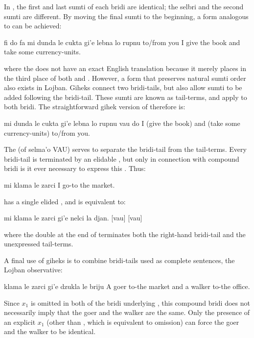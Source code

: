 In , the first and last sumti of
    each bridi are identical; the selbri and the second sumti are
    different. By moving the final sumti to the beginning, a form
    analogous to  can be achieved:
\begin{example}
fi do fa mi dunda le cukta\n
\T	gi'e lebna lo rupnu\n
to/from you I give the book\n
\T	and take some currency-units.
\end{example}

{\noindent}where the  does not have an exact English translation
    because it merely places  in the third place of both
     and . However, a form that preserves natural
    sumti order also exists in Lojban. Giheks connect two
    bridi-tails, but also allow sumti to be added following the
    bridi-tail. These sumti are known as tail-terms, and apply to
    both bridi. The straightforward gihek version of  therefore is:
\begin{example}
mi dunda le cukta\n
\T	gi'e lebna lo rupnu vau do\n
I (give the book)\n
\T	and (take some currency-units) to/from you.
\end{example}

The  (of selma'o VAU) serves to separate the bridi-tail
    from the tail-terms. Every bridi-tail is terminated by an
    elidable , but only in connection with compound bridi is
    it ever necessary to express this . Thus:
\begin{example}
mi klama le zarci \n
I go-to the market.
\end{example}

{\noindent}has a single elided , and  is equivalent to:
\begin{example}
mi klama le zarci \n
\T	gi'e nelci la djan. [vau] [vau]
\end{example}

{\noindent}where the double  at the end of  terminates both the right-hand bridi-tail and the
    unexpressed tail-terms. 

A final use of giheks is to combine bridi-tails used as
    complete sentences, the Lojban observative:
\begin{example}
klama le zarci gi'e dzukla le briju\n
A goer to-the market and a walker to-the office.
\end{example}

Since $x_1$ is omitted in both of the bridi underlying , this compound bridi does not
    necessarily imply that the goer and the walker are the same.
    Only the presence of an explicit $x_1$ (other than , which
    is equivalent to omission) can force the goer and the walker to
    be identical. 

